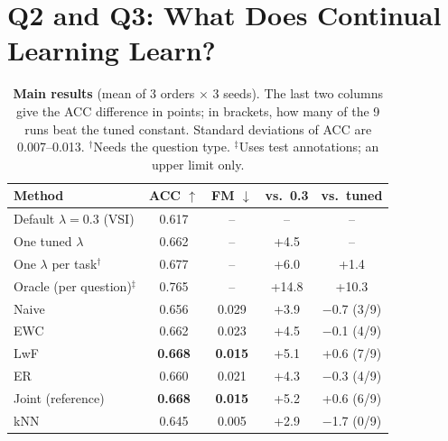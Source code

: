 \documentclass[10pt,twocolumn,letterpaper]{article}
\newcommand{\lam}{\lambda}
\begin{document}
\section{Q2 and Q3: What Does Continual Learning Learn?}
\label{sec:q2}

\begin{table}[t]
  \centering
  \small
  \setlength{\tabcolsep}{4pt}
  \begin{tabular}{lcccc}
    \toprule
    Method & ACC $\uparrow$ & FM $\downarrow$ & vs.\ 0.3 & vs.\ tuned \\
    \midrule
    Default $\lam=0.3$ (VSI) & 0.617 & -- & -- & -- \\
    One tuned $\lam$ & 0.662 & -- & +4.5 & -- \\
    One $\lam$ per task$^\dagger$ & 0.677 & -- & +6.0 & +1.4 \\
    Oracle (per question)$^\ddagger$ & 0.765 & -- & +14.8 & +10.3 \\
    \midrule
    Naive & 0.656 & 0.029 & +3.9 & $-$0.7 (3/9) \\
    EWC & 0.662 & 0.023 & +4.5 & $-$0.1 (4/9) \\
    LwF & \textbf{0.668} & \textbf{0.015} & +5.1 & +0.6 (7/9) \\
    ER & 0.660 & 0.021 & +4.3 & $-$0.3 (4/9) \\
    Joint (reference) & \textbf{0.668} & \textbf{0.015} & +5.2 & +0.6 (6/9) \\
    kNN & 0.645 & 0.005 & +2.9 & $-$1.7 (0/9) \\
    \bottomrule
  \end{tabular}
  \caption{\textbf{Main results} (mean of 3 orders $\times$ 3 seeds). The last two columns give the ACC difference in points; in brackets, how many of the 9 runs beat the tuned constant. Standard deviations of ACC are 0.007--0.013. $^\dagger$Needs the question type. $^\ddagger$Uses test annotations; an upper limit only.}
  \label{tab:main}
\end{table}
\end{document}

